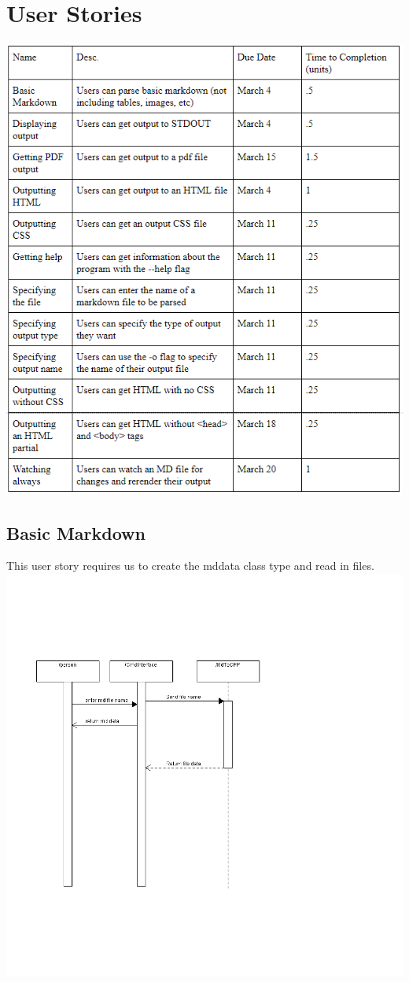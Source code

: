 \section{User Stories}

\includegraphics[width=400pt]{images/UserStoriesTable.png}

\subsection{Basic Markdown}
This user story requires us to create the mddata class type and read in files.
\includegraphics[width=400pt]{images/sequenceMdData.png}

